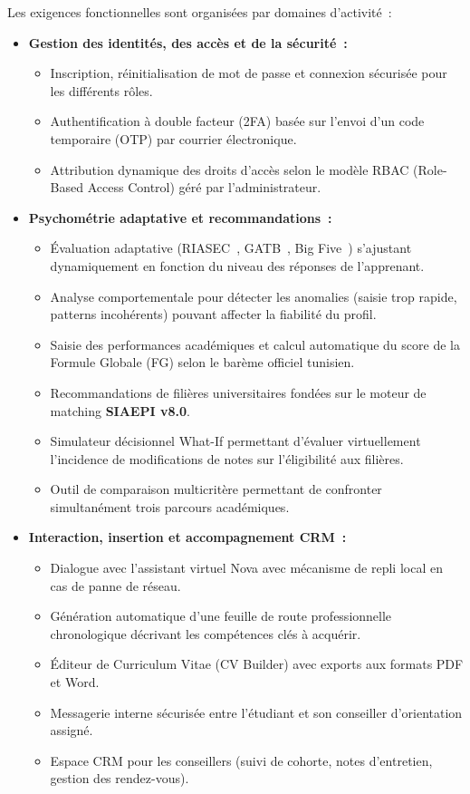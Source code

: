 Les exigences fonctionnelles sont organisées par domaines d'activité~:

\begin{itemize}
    \item \textbf{Gestion des identités, des accès et de la sécurité~:}
    \begin{itemize}
        \item Inscription, réinitialisation de mot de passe et connexion sécurisée pour les différents rôles.
        \item Authentification à double facteur (2FA) basée sur l'envoi d'un code temporaire (OTP) par courrier électronique.
        \item Attribution dynamique des droits d'accès selon le modèle RBAC (Role-Based Access Control) géré par l'administrateur.
    \end{itemize}

    \item \textbf{Psychométrie adaptative et recommandations~:}
    \begin{itemize}
        \item Évaluation adaptative (RIASEC~\cite{riasec}, GATB~\cite{gatb}, Big Five~\cite{bigfive}) s'ajustant dynamiquement en fonction du niveau des réponses de l'apprenant.
        \item Analyse comportementale pour détecter les anomalies (saisie trop rapide, patterns incohérents) pouvant affecter la fiabilité du profil.
        \item Saisie des performances académiques et calcul automatique du score de la Formule Globale (FG) selon le barème officiel tunisien.
        \item Recommandations de filières universitaires fondées sur le moteur de matching \textbf{SIAEPI v8.0}.
        \item Simulateur décisionnel What-If permettant d'évaluer virtuellement l'incidence de modifications de notes sur l'éligibilité aux filières.
        \item Outil de comparaison multicritère permettant de confronter simultanément trois parcours académiques.
    \end{itemize}

    \item \textbf{Interaction, insertion et accompagnement CRM~:}
    \begin{itemize}
        \item Dialogue avec l'assistant virtuel Nova avec mécanisme de repli local en cas de panne de réseau.
        \item Génération automatique d'une feuille de route professionnelle chronologique décrivant les compétences clés à acquérir.
        \item Éditeur de Curriculum Vitae (CV Builder) avec exports aux formats PDF et Word.
        \item Messagerie interne sécurisée entre l'étudiant et son conseiller d'orientation assigné.
        \item Espace CRM pour les conseillers (suivi de cohorte, notes d'entretien, gestion des rendez-vous).
    \end{itemize}


\end{itemize}

